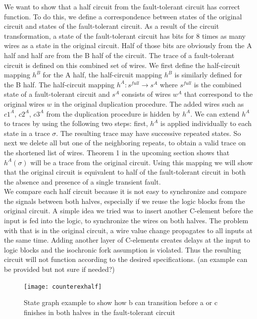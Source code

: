 \documentclass[12pt]{report}
\begin{document}
We want to show that a half circuit from the fault-tolerant circuit has correct function.  To do this, we define a correspondence between states of the original circuit and states of the fault-tolerant circuit.  As a result of the circuit transformation, a state of the fault-tolerant circuit has bits for 8 times as many wires as a state in the original circuit.  Half of those bits are obviously from the A half and half are from the B half of the circuit.  The trace of a fault-tolerant circuit is defined on this combined set of wires.  We first  define the half-circuit mapping $h^B$ for the A half, the half-circuit mapping $h^B$ is similarly defined for the B half.  The half-circuit mapping $h^A: s^{\textit{full}} \to s^A$ where $s^{\textit{full}}$ is the combined state of a fault-tolerant circuit and $s^A$ consists of wires $w^A$ that correspond to the original wires $w$ in the original duplication procedure.  The added wires such as $c1^A$, $c2^A$, $c3^A$ from the duplication procedure is hidden by $h^A$.  We can extend $h^A$ to traces by using the following two steps: first, $h^A$ is applied individually to each state in a trace $\sigma$.  %
The resulting trace may have successive repeated states.  So next we delete all but one of the neighboring repeats, to obtain a valid trace on the shortened list of wires.  Theorem 1 in the upcoming section shows that $h^A(\sigma)$ will be a trace from the original circuit.  
Using this mapping we will show that the original circuit is equivalent to half of the fault-tolerant circuit in both the absence and presence of a single transient fault.
\\

We compare each half circuit because it is not easy to synchronize and compare the signals between both halves, especially if we reuse the logic blocks from the original circuit.  A simple idea we tried was to insert another C-element before the input is fed into the logic, to synchronize the wires on both halves.  The problem with that is in the original circuit, a wire value change propagates to all inputs at the same time.  Adding another layer of C-elements creates delays at the input to logic blocks and the isochronic fork assumption is violated.  Thus the resulting circuit will not function according to the desired specifications.  (an example can be provided but not sure if needed?)\\  
\begin{figure}
  \centering
    \texttt{[image: counterexhalf]}
  \caption[State graph example of fault-tolerant circuit]{State graph example to show how b can transition before a or c finishes in both halves in the fault-tolerant circuit}
  \label{fig:counterexhalf}
\end{figure}
\end{document}
